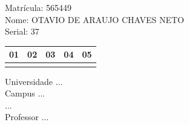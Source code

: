 \documentclass[10pt,a4paper,twocolumn]{report}
\begin{document}
Matrícula: 565449\\ Nome: OTAVIO DE ARAUJO CHAVES NETO \\ Serial: 37\\
\begin{tabular}{|l|l|l|l|l|}\hline
01  &02  &03  &04  &05 \\ \hline 
 & & & & \\ \hline 
\end{tabular}
 \cleardoublepage 

\begin{flushleft}
Universidade ...\\
Campus ...\\
...\\
Professor ...\\
\end{flushleft}
\end{document}
